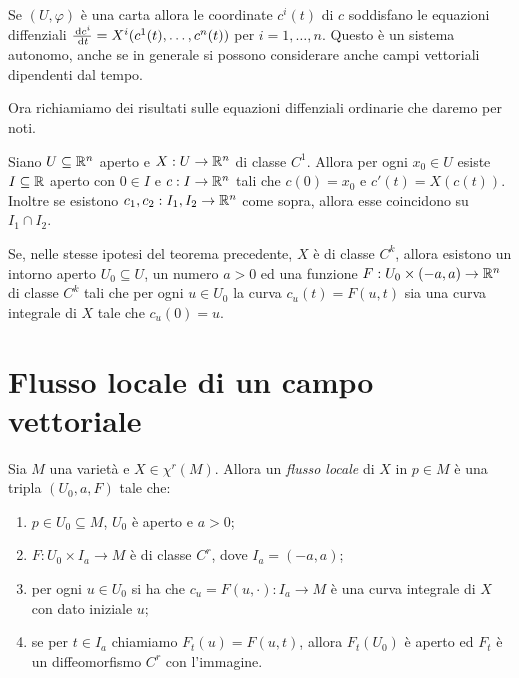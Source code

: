 Se $(U,\varphi)$ è una carta allora le coordinate $c^i(t)$ di $c$ soddisfano le equazioni diffenziali $\frac{\,\mathrm d c^i}{\,\mathrm d t}=X^i(c^1(t),\dots,c^n(t))$ per $i=1,\dots,n$. Questo è un sistema autonomo, anche se in generale si possono considerare anche campi vettoriali dipendenti dal tempo.
 
Ora richiamiamo dei risultati sulle equazioni diffenziali ordinarie che daremo per noti.
 
\begin{theorem}  
	Siano $U\subseteq\mathbb R^n$ aperto e $X:U\to\mathbb R^n$ di classe $C^1$. Allora per ogni $x_0\in U$ esiste $I\subseteq\mathbb R$ aperto con $0\in I$ e $c:I\to\mathbb R^n$ tali che $c(0)=x_0$ e $c'(t)=X(c(t))$. Inoltre se esistono $c_1,c_2:I_1,I_2\to\mathbb R^n$ come sopra, allora esse coincidono su $I_1\cap I_2$.
\end{theorem}

\begin{theorem} 
	Se, nelle stesse ipotesi del teorema precedente, $X$ è di classe $C^k$, allora esistono un intorno aperto $U_0\subseteq U$, un numero $a>0$ ed una funzione $F:U_0\times (-a,a)\to\mathbb R^n$ di classe $C^k$ tali che per ogni $u\in U_0$ la curva $c_u(t)=F(u,t)$ sia una curva integrale di $X$ tale che $c_u(0)=u$.
\end{theorem}

\section{Flusso locale di un campo vettoriale}

\begin{definition}\label{def:FlussoLocale} 
	Sia $M$ una varietà e $X\in\chi^r(M)$. Allora un \emph{flusso locale} di $X$ in $p\in M$ è una tripla $(U_0,a,F)$ tale che:
	\begin{enumerate}
	\item $p\in U_0\subseteq M$, $U_0$ è aperto e $a>0$; \label{FL:aperto}
	\item $F:U_0\times I_a\to M$ è di classe $C^r$, dove $I_a=(-a,a)$; \label{FL:Cr}
	\item per ogni $u\in U_0$ si ha che $c_u=F(u,\cdot):I_a\to M$ è una curva integrale di $X$ con dato iniziale $u$; \label{FL:curvaintegrale}
	\item se per $t\in I_a$ chiamiamo $F_t(u)=F(u,t)$, allora $F_t(U_0)$ è aperto ed $F_t$ è un diffeomorfismo $C^r$ con l'immagine. \label{FL:diffeo}
	\end{enumerate}
\end{definition}

